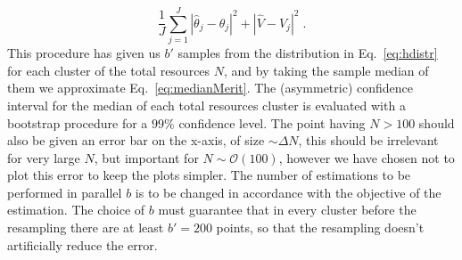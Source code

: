 \documentclass[aps, pra, 10pt, twocolumn, superscriptaddress,floatfix]{revtex4-1}
\begin{document}
%
\begin{equation}
	\frac{1}{J} \sum_{j=1}^J |\hat{\theta}_j - \theta_j|^2 + |\hat{V} - V_j|^2 \; .
\end{equation}
%
This procedure has given us $b'$ samples from the distribution in Eq.~\eqref{eq:hdistr} for each cluster of the total resources $N$, and by taking the sample median of them we approximate Eq.~\eqref{eq:medianMerit}. The (asymmetric) confidence interval for the median of each total resources cluster is evaluated with a bootstrap procedure for a $99\%$ confidence level. The point having $N > 100$ should also be given an error bar on the x-axis, of size $\sim \Delta N$, this should be irrelevant for very large $N$, but important for $N \sim \mathcal{O} (100)$, however we have chosen not to plot this error to keep the plots simpler. The number of estimations to be performed in parallel $b$ is to be changed in accordance with the objective of the estimation. The choice of $b$ must guarantee that in every cluster before the resampling there are at least $b' = 200$ points, so that the resampling doesn't artificially reduce the error.
\end{document}
